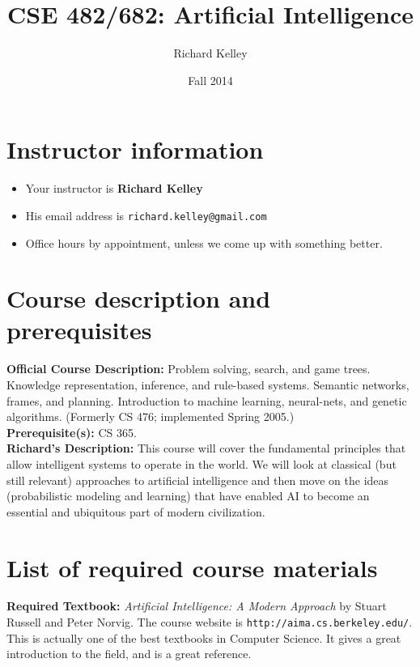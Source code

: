 \documentclass{article}
\begin{document}
\title{CSE 482/682: Artificial Intelligence}
\author{Richard Kelley}
\date{Fall 2014}
\maketitle

\section*{Instructor information}

\begin{itemize}
  \item Your instructor is \textbf{Richard Kelley}
  \item His email address is \verb|richard.kelley@gmail.com|
  \item Office hours by appointment, unless we come up with something better.
\end{itemize} 

\section*{Course description and prerequisites}

\textbf{Official Course Description:} Problem solving, search, and
game trees. Knowledge representation, inference, and rule-based
systems. Semantic networks, frames, and planning. Introduction to
machine learning, neural-nets, and genetic algorithms. (Formerly CS
476; implemented Spring 2005.)\\

\noindent
\textbf{Prerequisite(s):} CS 365.\\

\noindent
\textbf{Richard's Description:} This course will cover the fundamental
principles that allow intelligent systems to operate in the world. We
will look at classical (but still relevant) approaches to artificial
intelligence and then move on the ideas (probabilistic modeling and
learning) that have enabled AI to become an essential and ubiquitous
part of modern civilization.

\section*{List of required course materials}

\textbf{Required Textbook: } \textit{Artificial Intelligence: A Modern
  Approach} by Stuart Russell and Peter Norvig. The course website is
\verb|http://aima.cs.berkeley.edu/|. This is actually one of the best
textbooks in Computer Science. It gives a great introduction to the
field, and is a great reference.
\end{document}
